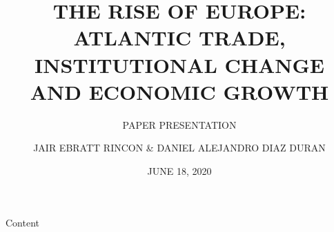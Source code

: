 \documentclass[pdftex,12pt,xcolor=pdftex,table]{beamer}
\theoremstyle{definition}
\theoremstyle{remark}
\numberwithin{equation}{section}
\numberwithin{figure}{section}
\begin{document}
\author[J.E.R. & D.A.D.D.]{JAIR EBRATT RINCON \& DANIEL ALEJANDRO DIAZ DURAN}
\title[THE RISE OF EUROPE]{THE RISE OF EUROPE: ATLANTIC TRADE, INSTITUTIONAL CHANGE AND ECONOMIC GROWTH}
\date{JUNE 18, 2020} 
\subtitle{PAPER PRESENTATION}



	\begin{frame}
		\maketitle
	\end{frame}

	\begin{frame}{Content}
		\tableofcontents
	\end{frame}
\end{document}
